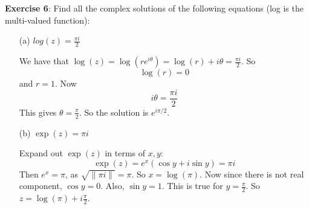 \documentclass{article}
\begin{document}
\textbf{Exercise 6}: Find all the complex solutions of the following equations (log is the multi-valued function):
    \begin{itemize}
        \item [(a)] $log(z) = \frac{\pi i}{2}$
            \begin{answer}
                We have that $\mathop{log}(z) = \mathop{log}(re^{i\theta}) = \mathop{log}(r) + i\theta = \frac{\pi i}{2}$. So 
                    \begin{equation*}
                        \mathop{log}(r) = 0
                    \end{equation*}
                and $r = 1$. Now
                    \begin{equation*}
                        i\theta = \dfrac{\pi i}{2}
                    \end{equation*}
                This gives $\theta = \frac{\pi}{2}$. So the solution is $e^{i\pi/2}$.
            \end{answer}

        \item [(b)] $\exp(z) = \pi i$
            \begin{answer}
                Expand out $\exp(z)$ in terms of $x, y$: 
                    \begin{equation*}
                        \exp(z) = e^{x}(\cos{y} + i\sin{y}) = \pi i
                    \end{equation*}
                Then $e^{x} = \pi$, as $\sqrt{\lVert \pi i \rVert} = \pi$. So $x = \mathop{log}(\pi)$. Now since there is not real component, $\cos{y} = 0$. Also, $\sin{y} = 1$. This is true for $y = \frac{\pi}{2}$. So $z = \mathop{log}(\pi) + i\frac{\pi}{2}$.
            \end{answer}


\end{itemize}
\end{document}
